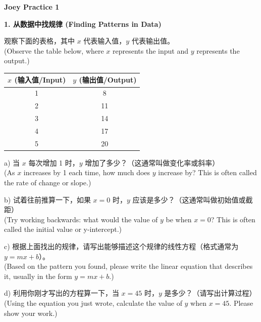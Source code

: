 \documentclass[12pt]{article}
\begin{document}
\begin{center}
    {\Large \textbf{Joey Practice 1}} \\
\end{center}

\vspace{0.5cm}

\textbf{1. 从数据中找规律 (Finding Patterns in Data)}

观察下面的表格，其中 $x$ 代表输入值，$y$ 代表输出值。\\
(Observe the table below, where $x$ represents the input and $y$ represents the output.)

\begin{table}[ht]
\centering
\begin{tabular}{|c|c|}
\hline
$x$ (输入值/Input) & $y$ (输出值/Output) \\
\hline
1 & 8 \\
2 & 11 \\
3 & 14 \\
4 & 17 \\
5 & 20 \\
\hline
\end{tabular}
\end{table}

a) 当 $x$ 每次增加 1 时，$y$ 增加了多少？（这通常叫做变化率或斜率）\\
(As $x$ increases by 1 each time, how much does $y$ increase by? This is often called the rate of change or slope.)
\vspace{1.5cm}

b) 试着往前推算一下，如果 $x = 0$ 时，$y$ 应该是多少？（这通常叫做初始值或截距）\\
(Try working backwards: what would the value of $y$ be when $x = 0$? This is often called the initial value or y-intercept.)
\vspace{1.5cm}

c) 根据上面找出的规律，请写出能够描述这个规律的线性方程（格式通常为 $y = mx + b$）。\\
(Based on the pattern you found, please write the linear equation that describes it, usually in the form $y = mx + b$.)
\vspace{2cm}

d) 利用你刚才写出的方程算一下，当 $x = 45$ 时，$y$ 是多少？（请写出计算过程）\\
(Using the equation you just wrote, calculate the value of $y$ when $x = 45$. Please show your work.)
\vspace{3cm}
\end{document}
